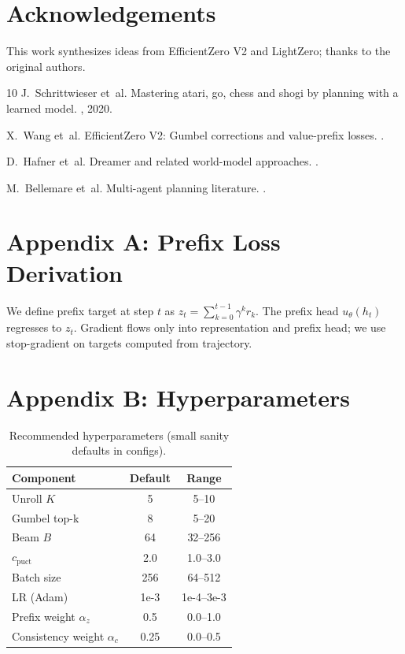 \documentclass[10pt]{article}
\begin{document}
\section*{Acknowledgements}
This work synthesizes ideas from EfficientZero V2 and LightZero; thanks to the original authors.


\begin{thebibliography}{10}
J.~Schrittwieser et~al.
\newblock Mastering atari, go, chess and shogi by planning with a learned model.
, 2020.

X.~Wang et~al.
\newblock EfficientZero V2: Gumbel corrections and value-prefix losses.
.

D.~Hafner et~al.
\newblock Dreamer and related world-model approaches.
.

M.~Bellemare et~al.
\newblock Multi-agent planning literature.
.
\end{thebibliography}

\appendix
\section{Appendix A: Prefix Loss Derivation}
We define prefix target at step $t$ as $z_t=\sum_{k=0}^{t-1}\gamma^k r_k$. The prefix head $u_\theta(h_t)$ regresses to $z_t$. Gradient flows only into representation and prefix head; we use stop-gradient on targets computed from trajectory.

\section{Appendix B: Hyperparameters}
\begin{table}[h]
\centering
\begin{tabular}{lcc}
\toprule
Component & Default & Range \\
\midrule
Unroll $K$ & 5 & 5--10 \\
Gumbel top-k & 8 & 5--20 \\
Beam $B$ & 64 & 32--256 \\
$c_{\text{puct}}$ & 2.0 & 1.0--3.0 \\
Batch size & 256 & 64--512 \\
LR (Adam) & 1e-3 & 1e-4--3e-3 \\
Prefix weight $\alpha_z$ & 0.5 & 0.0--1.0 \\
Consistency weight $\alpha_c$ & 0.25 & 0.0--0.5 \\
\bottomrule
\end{tabular}
\caption{Recommended hyperparameters (small sanity defaults in configs).}
\end{table}
\end{document}

